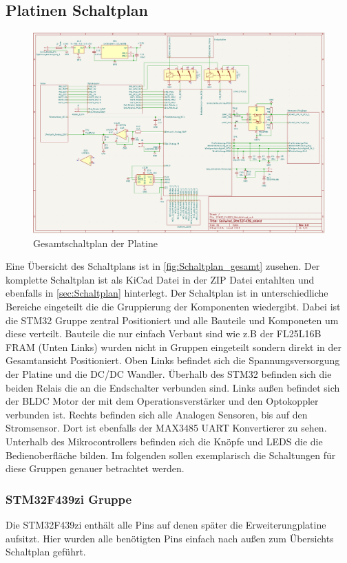 \subsection{Platinen Schaltplan}
\begin{figure}[H]
	\centering
	\includegraphics[width=1.0\textwidth]{images/Hardware/Schaltplan_Gesamt.PNG}
	\caption{Gesamtschaltplan der Platine}
	\label{fig:Schaltplan_gesamt}
\end{figure}
Eine Übersicht des Schaltplans ist in \autoref{fig:Schaltplan_gesamt} zusehen. Der komplette Schaltplan ist als KiCad Datei in der ZIP Datei entahlten und ebenfalls in \autoref{sec:Schaltplan} hinterlegt. Der Schaltplan ist in unterschiedliche Bereiche eingeteilt die die Gruppierung der Komponenten wiedergibt. Dabei ist die STM32 Gruppe zentral Positioniert und alle Bauteile und Komponeten um diese verteilt. Bauteile die nur einfach Verbaut sind wie z.B der FL25L16B \ac{FRAM} (Unten Links) wurden nicht in Gruppen eingeteilt sondern direkt in der Gesamtansicht Positioniert. Oben Links befindet sich die Spannungsversorgung der Platine und die \ac{DC}/DC Wandler. Überhalb des STM32 befinden sich die beiden Relais die an die Endschalter verbunden sind. Links außen befindet sich der \ac{BLDC} Motor der mit dem Operationsverstärker und den Optokoppler verbunden ist. Rechts befinden sich alle Analogen Sensoren, bis auf den Stromsensor. Dort ist ebenfalls der MAX3485 \ac{UART} Konvertierer zu sehen. Unterhalb des Mikrocontrollers befinden sich die Knöpfe und LEDS die die Bedienoberfläche bilden. Im folgenden sollen exemplarisch die Schaltungen für diese Gruppen genauer betrachtet werden.
\subsubsection{STM32F439zi Gruppe}
Die STM32F439zi enthält alle Pins auf denen später die Erweiterungplatine aufsitzt. Hier wurden alle benötigten Pins einfach nach außen zum Übersichts Schaltplan geführt.
